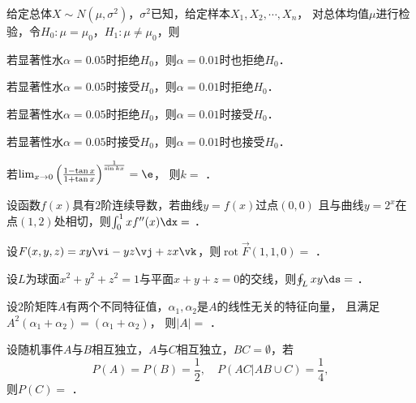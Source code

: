 \documentclass[plain,noanswer,medmath]{../../template/jnuexam}
\begin{document}
\begin{problem}
给定总体$X\sim N\left(\mu ,\sigma^2 \right)$，$\sigma^2$已知，给定样本$X_1,X_2, \cdots ,X_n$，
对总体均值$\mu$进行检验，令$H_0:\mu = \mu_0$，$H_1:\mu \ne \mu_0$，则\pickout{}
\begin{abcd}
\item 若显著性水$\alpha = 0.05$时拒绝$H_0$，则$\alpha = 0.01$时也拒绝$H_0$．
\item 若显著性水$\alpha = 0.05$时接受$H_0$，则$\alpha = 0.01$时拒绝$H_0$．
\item 若显著性水$\alpha = 0.05$时拒绝$H_0$，则$\alpha = 0.01$时接受$H_0$．
\item 若显著性水$\alpha = 0.05$时接受$H_0$，则$\alpha = 0.01$时也接受$H_0$．
\end{abcd}
\end{problem}




\begin{problem}
若$\lim_{x \to 0} \left(\frac{1 - \tan x}{1 + \tan x} \right)^{\frac{1}{\sin kx}} = \e$，
则$k =$ \fillin{}．
\end{problem}


\begin{problem}
设函数$f(x)$具有$2$阶连续导数，若曲线$y = f(x)$过点$(0,0)$
且与曲线$y = 2^x$在点$(1,2)$处相切，则$\int_0^1 xf''(x)\dx =$ \fillin{}．
\end{problem}


\begin{problem}
设$F(x,y,z) = xy\vi - yz\vj + zx\vk$，则$\operatorname{rot}\vec{F}(1,1,0) =$ \fillin{}．
\end{problem}


\begin{problem}
设$L$为球面$x^2 + y^2 + z^2 = 1$与平面$x + y + z = 0$的交线，则$\oint_L xy\ds =$ \fillin{}．
\end{problem}


\begin{problem}
设$2$阶矩阵$A$有两个不同特征值，$\alpha_1,\alpha_2$是$A$的线性无关的特征向量，
且满足$A^2(\alpha_1 + \alpha_2) = (\alpha_1 + \alpha_2)$，
则$|A| =$ \fillin{}．
\end{problem}


\begin{problem}
设随机事件$A$与$B$相互独立，$A$与$C$相互独立，$BC = \emptyset$，若
$$P(A) = P(B) = \frac{1}{2},\quad P\left(AC|AB \cup C \right) = \frac{1}{4},$$
则$P(C) =$ \fillin{}．
\end{problem}
\end{document}
